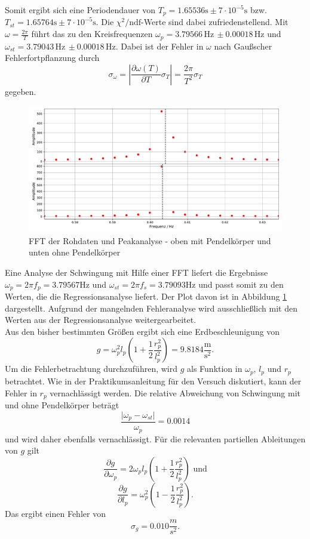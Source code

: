 Somit ergibt sich eine Periodendauer von $T_p = 1.65536 \text{s} \pm 7\cdot 10^{-5} \text{s}$ bzw. $T_{st} = 1.65764 \text{s} \pm 7\cdot 10^{-5}\text{s}$. Die $\chi^2/\text{ndf}$-Werte sind dabei zufriedenstellend. Mit $\omega = \frac{2\pi}{T}$ führt das zu den Kreisfrequenzen $\omega_p = 3.79566\, \text{Hz}\, \pm 0.00018\, \text{Hz}$ und $\omega_{st} = 3.79043\, \text{Hz} \,\pm 0.00018\, \text{Hz}$. Dabei ist der Fehler in $\omega$ nach Gaußscher Fehlerfortpflanzung durch
$$ \sigma_\omega = \left| \frac{\partial \omega (T)}{\partial T} \sigma_T \right | = \frac{2\pi}{T^2} \sigma_T $$
gegeben.

\begin{figure}[h]
	\centering
	\includegraphics[width = \textwidth]{plots/fft.pdf}
	\caption{FFT der Rohdaten und Peakanalyse - oben mit Pendelkörper und unten ohne Pendelkörper}\label{plot:fft}
\end{figure}

Eine Analyse der Schwingung mit Hilfe einer FFT liefert die Ergebnisse $\omega_p = 2\pi f_p =  3.79567 \text{Hz}$ und $\omega_{st} = 2\pi f_s = 3.79093 \text{Hz}$ und passt somit zu den Werten, die die Regressionsanalyse liefert. Der Plot davon ist in Abbildung \ref{plot:fft} dargestellt. Aufgrund der mangelnden Fehleranalyse wird ausschließlich mit den Werten aus der Regressionsanalyse weitergearbeitet. \\
Aus den bisher bestimmten Größen ergibt sich eine Erdbeschleunigung von 
$$ g = \omega_p^2l_p \left( 1 + \frac 12 \frac{r_p^2}{l_p^2} \right) = 9.8184 \frac{\text{m}}{\text{s}^2}\text{.}$$
Um die Fehlerbetrachtung durchzuführen, wird $g$ als Funktion in $\omega_p$, $l_p$ und $r_p$ betrachtet. Wie in der Praktikumsanleitung für den Versuch diskutiert, kann der Fehler in $r_p$ vernachlässigt werden. Die relative Abweichung von Schwingung mit und ohne Pendelkörper beträgt
$$\frac{\lvert \omega_p - \omega_{st}\rvert}{\omega_p} = 0.0014$$
und wird daher ebenfalls vernachlässigt. Für die relevanten partiellen Ableitungen von $g$ gilt
$$\frac{\partial g}{\partial \omega_p} = 2\omega_p l_p \left(1+\frac 12 \frac{r_p^2}{l_p^2}\right) \text{ und}$$
$$\frac{\partial g}{\partial l_p} = \omega_p^2 \left(1-\frac 12 \frac{r_p^2}{l_p^2}\right)\text{.}$$
Das ergibt einen Fehler von
$$\sigma_g = 0.010 \frac{m}{s^2}\text{.}$$

